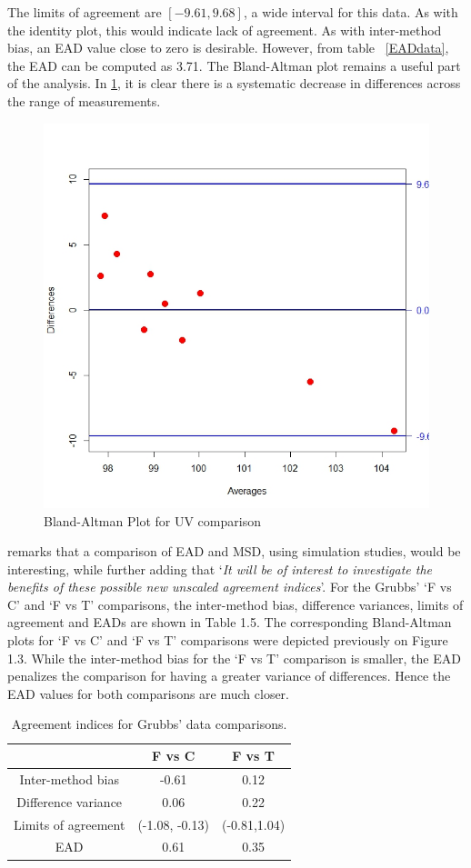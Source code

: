 \documentclass[12pt, a4paper]{report}
\theoremstyle{plain}
\theoremstyle{definition}
\theoremstyle{remark}
\begin{document}
The limits of agreement are $[-9.61, 9.68]$, a wide interval for this data. As with the identity plot, this would indicate lack of agreement. As with inter-method bias, an EAD value close to zero is desirable. However, from table ~\ref{EADdata}, the EAD can be computed as 3.71. The Bland-Altman plot remains a useful part of the analysis. In \ref{fig:EAD1}, it is clear there is a systematic decrease in differences across the range of measurements.
\begin{figure}
	\centering
	\includegraphics[width=0.5\linewidth]{images/EAD1}
	\caption{Bland-Altman Plot for UV comparison}
	\label{fig:EAD1}
\end{figure}

\citet{Barnhart} remarks that a comparison of EAD and MSD, using
simulation studies, would be interesting, while further adding
that `\textit{It will be of interest to investigate the benefits of these
	possible new unscaled agreement indices}'. For the Grubbs' `F vs C' and `F vs T' comparisons, the inter-method bias, difference variances, limits of agreement and EADs are shown
in Table 1.5. The corresponding Bland-Altman plots for `F vs C' and `F vs T' comparisons were depicted previously on Figure 1.3. While the inter-method bias for the `F vs T' comparison is smaller, the EAD penalizes the comparison for having a greater variance of differences. Hence the EAD values for both comparisons are much closer.
\begin{table}[ht]
	\begin{center}
		\begin{tabular}{|c||c|c|}
			\hline
			& F vs C & F vs T  \\\hline
			\hline
			Inter-method bias & -0.61 & 0.12 \\ \hline
			Difference variance & 0.06 & 0.22  \\ \hline 
			Limits of agreement & (-1.08,	-0.13) & (-0.81,1.04) \\ \hline
			EAD & 0.61 & 0.35  \\ \hline 
			
		\end{tabular}
		\caption{Agreement indices for Grubbs' data comparisons.}
	\end{center}
\end{table}
\end{document}
